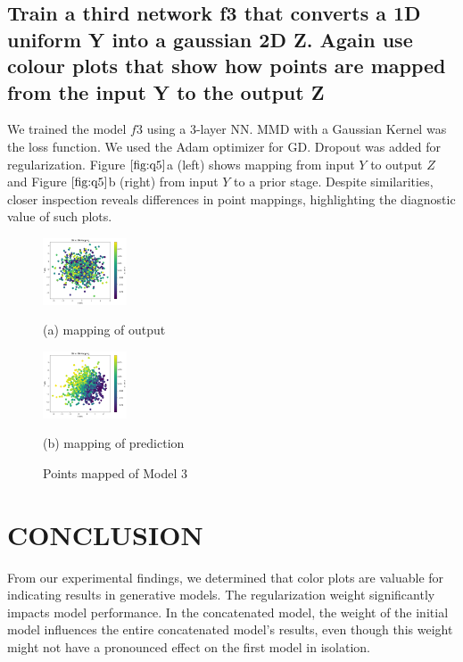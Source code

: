 \documentclass{article}
\begin{document}
\subsection{Train a third network f3 that converts a 1D uniform Y
into a gaussian 2D Z. 
Again use colour plots that show how points are mapped from
the input Y to the output Z}
\label{ssec:q5}

We trained the model $f3$ using a 3-layer NN. 
MMD with a Gaussian Kernel was the loss function. 
We used the Adam optimizer for GD. 
Dropout was added for regularization. 
Figure $\ref{fig:q5}$a (left) shows mapping from input $Y$ to output $Z$ 
and Figure $\ref{fig:q5}$b (right) from input $Y$ to a prior stage. 
Despite similarities, closer inspection reveals differences in 
point mappings, highlighting the diagnostic value of such plots.


\begin{figure}[htb]
  \begin{minipage}[a]{.48\linewidth}
    \centering
    \centerline{\includegraphics[width=2.5cm]{images/q5_1}}
    \centerline{(a) mapping of output}\medskip
  \end{minipage}
  \hfill
  \begin{minipage}[c]{0.48\linewidth}
    \centering
    \centerline{\includegraphics[width=2.5cm]{images/q5_2}}
    \centerline{(b) mapping of prediction}\medskip
  \end{minipage}
  \caption{Points mapped of Model 3}
  \label{fig:q5}
  \end{figure}

\section{CONCLUSION}
\label{sec:conclusion}

From our experimental findings, we determined that color plots are valuable for indicating results in generative models. 
The regularization weight significantly impacts model performance. 
In the concatenated model, the weight of the initial model influences the entire concatenated model's results, even though this weight might not have a pronounced effect on the first model in isolation.
\end{document}
